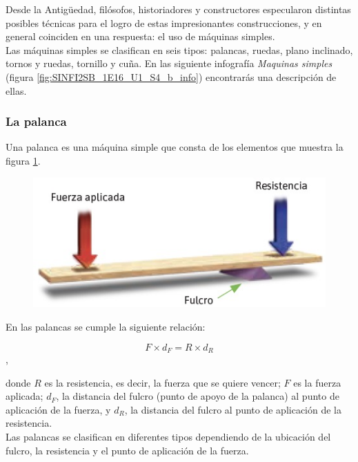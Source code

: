 \documentclass[11pt]{book}
\begin{document}
Desde la Antigüedad, filósofos, historiadores y constructores especularon
distintas posibles técnicas para el logro de estas impresionantes construcciones,
y en general coinciden en una respuesta: el uso de máquinas simples.\\


Las máquinas simples se clasifican en seis tipos: palancas, ruedas, plano inclinado,
tornos y ruedas, tornillo y cuña. En las siguiente infografía \emph{Maquinas simples}
(figura \ref{fig:SINFI2SB_1E16_U1_S4_b_info})
encontrarás una descripción de ellas.

\subsubsection{La palanca}
Una palanca es una máquina simple que consta de los elementos que muestra la
figura \ref{fig:palanca_gral}.

\begin{figure}[H]
  \centering
  \includegraphics[width=0.6\linewidth]{palanca_gral.jpg}
  \label{fig:palanca_gral}
\end{figure}

En las palancas se cumple la siguiente relación:

\begin{equation}
  F \times d_F = R \times d_R
\end{equation},

donde $R$ es la resistencia, es decir, la fuerza que se quiere vencer; $F$ es
la fuerza aplicada; $d_F$, la distancia del fulcro (punto de apoyo de la palanca)
al punto de aplicación de la fuerza, y $d_R$, la distancia del fulcro al punto de
aplicación de la resistencia. \\

Las palancas se clasifican en diferentes tipos dependiendo de la ubicación del
fulcro, la resistencia y el punto de aplicación de la fuerza.
\end{document}
